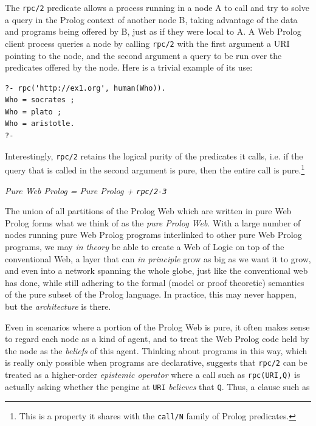 \documentclass{tlp}
\begin{document}
The \texttt{rpc/2} predicate allows a process running in a node A to call and try to solve a query in the Prolog context of another node B, taking advantage of the data and programs being offered by B, just as if they were local to A. A Web Prolog client process queries a node by calling \texttt{rpc/2} with the first argument a URI pointing to the node, and the second argument a query to be run over the predicates offered by the node. Here is a trivial example of its use:

\begin{lstlisting}
?- rpc('http://ex1.org', human(Who)).
Who = socrates ;
Who = plato ;
Who = aristotle.
?-
\end{lstlisting}

\noindent Interestingly, \texttt{rpc/2} retains the logical purity of the predicates it calls, i.e. if the query that is called in the second argument is pure, then the entire call is pure.\footnote{This is a property it shares with the \texttt{call/N} family of Prolog predicates.}

\begin{center}
\textit{Pure Web Prolog = Pure Prolog + \texttt{rpc/2-3}}
\end{center}

\noindent The union of all partitions of the Prolog Web which are written in pure Web Prolog forms what we think of as the \textit{pure Prolog Web}. With a large number of nodes running pure Web Prolog programs interlinked to other pure Web Prolog programs, we may \textit{in theory} be able to create a Web of Logic on top of the conventional Web, a layer that can \textit{in principle} grow as big as we want it to grow, and even into a network spanning the whole globe, just like the conventional web has done, while still adhering to the formal (model or proof theoretic) semantics of the pure subset of the Prolog language. In practice, this may never happen, but the \textit{architecture} is there. 

Even in scenarios where a portion of the Prolog Web is pure, it often makes sense to regard each node as a kind of agent, and to treat the Web Prolog code held by the node as the \textit{beliefs} of this agent. Thinking about programs in this way, which is really only possible when programs are declarative, suggests that \texttt{rpc/2} can be treated as a higher-order \textit{epistemic operator} where a call such as \texttt{rpc(URI,Q)} is actually asking whether the pengine at \texttt{URI} \textit{believes} that \texttt{Q}. Thus, a clause such as
\end{document}
